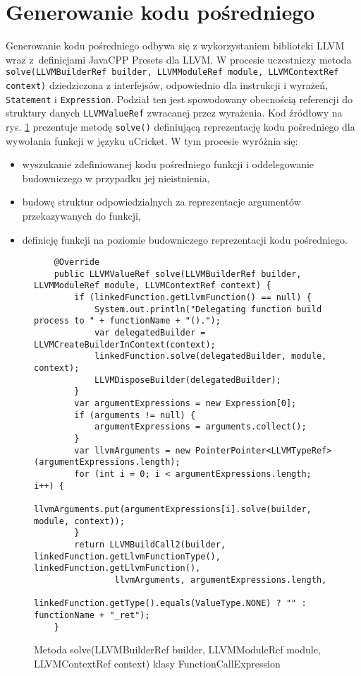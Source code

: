 \section{Generowanie kodu pośredniego}
Generowanie kodu pośredniego odbywa się z wykorzystaniem biblioteki LLVM wraz z~definicjami JavaCPP Presets dla LLVM. W procesie uczestniczy metoda \lstinline|solve(LLVMBuilderRef builder, LLVMModuleRef module, LLVMContextRef context)| dziedziczona z interfejsów, odpowiednio dla instrukcji i wyrażeń, \lstinline|Statement| i \lstinline|Expression|. Podział ten jest spowodowany obecnością referencji do struktury danych \lstinline|LLVMValueRef| zwracanej przez wyrażenia. Kod źródłowy na rys. \ref{fig:lst:ir-solve} prezentuje metodę \lstinline|solve()| definiującą reprezentację kodu pośredniego dla wywołania funkcji w języku uCricket. W tym procesie wyróżnia się:
\begin{itemize}
\item wyszukanie zdefiniowanej kodu pośredniego funkcji i oddelegowanie budowniczego w przypadku jej nieistnienia,
\item budowę struktur odpowiedzialnych za reprezentacje argumentów przekazywanych do funkcji,
\item definicję funkcji na poziomie budowniczego reprezentacji kodu pośredniego.
\end{itemize}
\begin{figure}
\begin{lstlisting}
    @Override
    public LLVMValueRef solve(LLVMBuilderRef builder, LLVMModuleRef module, LLVMContextRef context) {
        if (linkedFunction.getLlvmFunction() == null) {
            System.out.println("Delegating function build process to " + functionName + "().");
            var delegatedBuilder = LLVMCreateBuilderInContext(context);
            linkedFunction.solve(delegatedBuilder, module, context);
            LLVMDisposeBuilder(delegatedBuilder);
        }
        var argumentExpressions = new Expression[0];
        if (arguments != null) {
            argumentExpressions = arguments.collect();
        }
        var llvmArguments = new PointerPointer<LLVMTypeRef>(argumentExpressions.length);
        for (int i = 0; i < argumentExpressions.length; i++) {
            llvmArguments.put(argumentExpressions[i].solve(builder, module, context));
        }
        return LLVMBuildCall2(builder, linkedFunction.getLlvmFunctionType(), linkedFunction.getLlvmFunction(),
                llvmArguments, argumentExpressions.length,
                linkedFunction.getType().equals(ValueType.NONE) ? "" : functionName + "_ret");
    }
\end{lstlisting}
\caption{Metoda solve(LLVMBuilderRef builder, LLVMModuleRef module, LLVMContextRef context) klasy FunctionCallExpression}
\label{fig:lst:ir-solve}
\end{figure}
